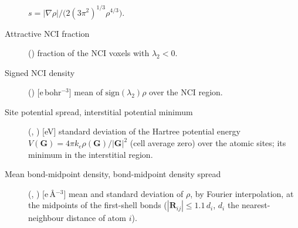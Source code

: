 \documentclass[journal=jctcce,manuscript=suppinfo,email=true]{achemso}
\newcommand{\rev}[1]{{\color{blue}#1}}
\begin{document}
\begin{description}
$s=|\nabla\rho|/\big(2(3\pi^2)^{1/3}\rho^{4/3}\big)$.
\item[Attractive NCI fraction] () fraction of the NCI voxels with $\lambda_2<0$.
\item[Signed NCI density] () [e\,bohr$^{-3}$] mean of
$\mathrm{sign}(\lambda_2)\rho$ over the NCI region.
\item[Site potential spread, interstitial potential minimum] (, ) [eV] standard deviation of the Hartree
potential energy $V(\mathbf G)=4\pi k_e\rho(\mathbf G)/|\mathbf G|^2$ (cell
average zero) over the atomic sites; its minimum in the interstitial \rev{region}.
\item[Mean bond-midpoint density, bond-midpoint density spread] (, ) [e\,\AA$^{-3}$] mean and standard
deviation of $\rho$, by Fourier interpolation, at the midpoints of the
first-shell bonds ($|\mathbf R_{ij}|\le1.1\,d_i$, $d_i$ the nearest-neighbour
distance of atom $i$).
\end{description}
\end{document}
